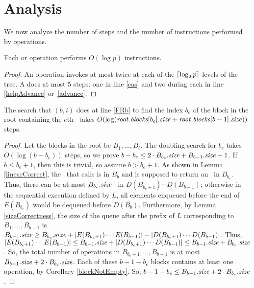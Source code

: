 
\section{Analysis}
\label{sec-analysis}

We now analyze the number of steps and the number of  instructions performed by operations.

\begin{proposition}\label{casbound}
Each  or  operation performs $O(\log p)$  instructions.
\end{proposition}
\begin{proof}
An operation invokes  at most twice at each of the $\lceil \log_2 p \rceil$ levels of the tree.
A  does at most 5  steps: one in line \ref{cas} and two during each  in line \ref{helpAdvance} or~\ref{advance}.
\end{proof}



\begin{lemma}\label{dSearchTime}
The search that $(b,i)$ does at line \ref{FRb} to find the index $b_e$ of the block in the root containing the $e$th \enqueue\ takes $O(\log (\mbox{\textnormal{\textit{root}}}.\mbox{\textit{blocks}}[b_e].\mbox{\textit{size}} + \mbox{\textnormal{\textit{root}}}.\mbox{\textit{blocks}}[b-1].\mbox{\textit{size}}))$ steps.
\end{lemma}
\begin{proof}
Let the blocks in the root be $B_1, \ldots, B_\ell$.
The doubling search for $b_e$ takes $O(\log (b-b_e))$ steps,
so we prove $b - b_e \leq 2 \cdot B_{b_e}.\mbox{\textit{size}} + B_{b-1}.\mbox{\textit{size}} + 1$.
If $b \leq b_e+1$, then this is trivial, so assume  $b>b_e+1$.
%
As shown in Lemma \ref{linearCorrect}, the \dequeue\ that calls  is in $B_b$ and is supposed to return an \enqueue\ in $B_{b_e}$.
Thus, there can be at most $B_{b_e}.\mbox{\textit{size}}$ \dequeues\ in 
$D(B_{b_e+1}) \cdots D(B_{b-1})$; otherwise in the sequential execution defined by $L$,
all elements enqueued before the end of
$E(B_{b_e})$ would be dequeued before $D(B_b)$. 
Furthermore, by Lemma \ref{sizeCorrectness}, the size of the queue  after the prefix of $L$ corresponding to 
$B_1,\ldots,B_{b-1}$  is 
$B_{b-1}.\mbox{\textit{size}} \geq B_{b_e}.size + |E(B_{b_e+1})\cdots E(B_{b-1})| - |D(B_{b_e+1})\cdots D(B_{b-1})|$.
Thus, $|E(B_{b_e+1})\cdots E(B_{b-1})| \leq B_{b-1}.\mbox{\textit{size}} + |D(B_{b_e+1})\cdots D(B_{b-1})| \leq B_{b-1}.\mbox{\textit{size}} + B_{b_e}.\mbox{\textit{size}}$.
So, the total number of operations in $B_{b_e+1}, \ldots, B_{b-1}$ is at most
$B_{b-1}.\mbox{\textit{size}} + 2\cdot B_{b_e}.\mbox{\textit{size}}$.
Each of these $b-1-b_e$ blocks contains at least one operation, by Corollary \ref{blockNotEmpty}.
So, $b-1-b_e \leq B_{b-1}.\mbox{\textit{size}} + 2\cdot B_{b_e}.\mbox{\textit{size}}$.
\end{proof}

